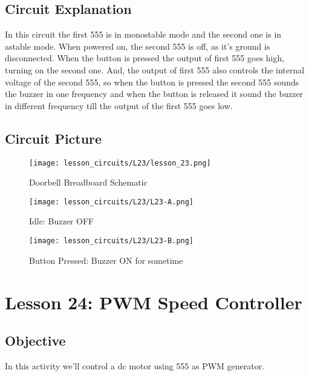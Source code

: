 \subsection{Circuit Explanation}
In this circuit the first 555 is in monostable mode and the second one is in astable mode. When powered on, the second 555 is 
off, as it's ground is disconnected. When the button is pressed the output of first 555 goes high, turning on the second one. 
And, the output of first 555 also controls the internal voltage of the second 555, so when the button is pressed the second 555 
sounds the buzzer in one frequency and when the button is released it sound the buzzer in different frequency till the output of 
the first 555 goes low.
\subsection{Circuit Picture}
\begin{figure}[!htp]
    \centering
    \texttt{[image: lesson\_circuits/L23/lesson\_23.png]}
    \caption{Doorbell Breadboard Schematic}
    \label{fig:555_doorbell_sch}
\end{figure}
\begin{figure}[!htp]
    \centering
    \texttt{[image: lesson\_circuits/L23/L23-A.png]}
    \caption{Idle: Buzzer OFF}
    \label{fig:555_doorbell_obb}
\end{figure}
\begin{figure}[!htp]
    \centering
    \texttt{[image: lesson\_circuits/L23/L23-B.png]}
    \caption{Button Pressed: Buzzer ON for sometime}
    \label{fig:555_doorbell_obb1}
\end{figure}
\section{Lesson 24: PWM Speed Controller}
\subsection{Objective}
In this activity we'll control a dc motor using 555 as PWM generator.
